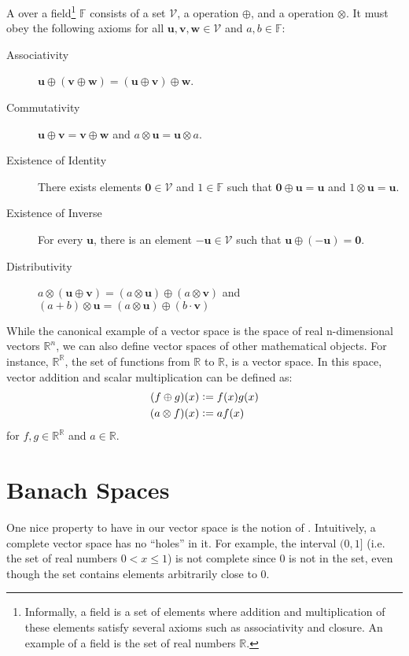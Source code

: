 \begin{definition}
A  over a field\footnote{Informally, a field is a set of elements where addition and multiplication of these elements satisfy several axioms such as associativity and closure. An example of a field is the set of real numbers $\mathbb{R}$.} $\mathbb{F}$ consists of a set $\mathcal{V}$, a  operation $\oplus$, and a  operation $\otimes$. It must obey the following axioms for all $\mathbf{u}, \mathbf{v}, \mathbf{w} \in \mathcal{V}$ and $a, b \in \mathbb{F}$:
%
\begin{description}
  \item[Associativity] $\mathbf{u} \oplus (\mathbf{v} \oplus \mathbf{w}) = (\mathbf{u} \oplus \mathbf{v}) \oplus \mathbf{w}$.
  \item[Commutativity] $\mathbf{u} \oplus \mathbf{v} = \mathbf{v} \oplus \mathbf{w}$ and $a \otimes \mathbf{u} = \mathbf{u} \otimes a$.
  \item[Existence of Identity] There exists elements $\mathbf{0} \in \mathcal{V}$ and $1 \in \mathbb{F}$ such that $\mathbf{0} \oplus \mathbf{u} = \mathbf{u}$ and $1 \otimes \mathbf{u} = \mathbf{u}$.
  \item[Existence of Inverse] For every $\mathbf{u}$, there is an element $-\mathbf{u} \in \mathcal{V}$ such that $\mathbf{u} \oplus (-\mathbf{u}) = \mathbf{0}$.
  \item[Distributivity] $a \otimes (\mathbf{u} \oplus \mathbf{v}) = (a \otimes \mathbf{u}) \oplus (a \otimes \mathbf{v})$ and $(a + b) \otimes \mathbf{u} = (a \otimes \mathbf{u}) \oplus (b \cdot \mathbf{v})$
\end{description}
\end{definition}
%
While the canonical example of a vector space is the space of real n-dimensional vectors $\mathbb{R}^n$, we can also define vector spaces of other mathematical objects. For instance, $\mathbb{R}^\mathbb{R}$, the set of functions from $\mathbb{R}$ to $\mathbb{R}$, is a vector space. In this space, vector addition and scalar multiplication can be defined as:
%
\begin{align}
  (f \oplus g)(x) &\vcentcolon= f(x) g(x) \\
  (a \otimes f)(x) &\vcentcolon= a f(x)
\end{align}
%
for $f, g \in \mathbb{R}^\mathbb{R}$ and $a \in \mathbb{R}$. 

\section{Banach Spaces}
One nice property to have in our vector space is the notion of . Intuitively, a complete vector space has no ``holes'' in it. For example, the interval $(0, 1]$ (i.e. the set of real numbers $0 < x \leq 1$) is not complete since $0$ is not in the set, even though the set contains elements arbitrarily close to $0$.

